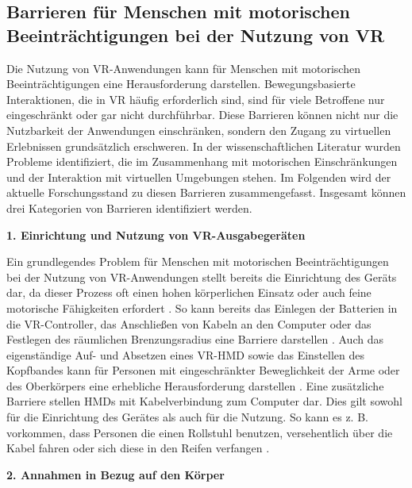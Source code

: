 \subsection{Barrieren für Menschen mit motorischen Beeinträchtigungen bei der Nutzung von VR}

Die Nutzung von VR-Anwendungen kann für Menschen mit motorischen Beeinträchtigungen eine Herausforderung darstellen. Bewegungsbasierte Interaktionen, die in VR häufig erforderlich sind, sind für viele Betroffene nur eingeschränkt oder gar nicht durchführbar. Diese Barrieren können nicht nur die Nutzbarkeit der Anwendungen einschränken, sondern den Zugang zu virtuellen Erlebnissen grundsätzlich erschweren. In der wissenschaftlichen Literatur wurden Probleme identifiziert, die im Zusammenhang mit motorischen Einschränkungen und der Interaktion mit virtuellen Umgebungen stehen. Im Folgenden wird der aktuelle Forschungsstand zu diesen Barrieren zusammengefasst. Insgesamt können drei Kategorien von Barrieren identifiziert werden.

{\normalfont \bfseries 1. Einrichtung und Nutzung von VR-Ausgabegeräten}  

Ein grundlegendes Problem für Menschen mit motorischen Beeinträchtigungen bei der Nutzung von VR-Anwendungen stellt bereits die Einrichtung des Geräts dar, da dieser Prozess oft einen hohen körperlichen Einsatz oder auch feine motorische Fähigkeiten erfordert \citep{gerling_critical_2021}. So kann bereits das Einlegen der Batterien in die VR-Controller, das Anschließen von Kabeln an den Computer oder das Festlegen des räumlichen Brenzungsradius eine Barriere darstellen \citep{mott_i_2020}. Auch das eigenständige Auf- und Absetzen eines VR-HMD sowie das Einstellen des Kopfbandes kann für Personen mit eingeschränkter Beweglichkeit der Arme oder des Oberkörpers eine erhebliche Herausforderung darstellen \citep{mott_i_2020}. Eine zusätzliche Barriere stellen HMDs mit Kabelverbindung zum Computer dar. Dies gilt sowohl für die Einrichtung des Gerätes als auch für die Nutzung. So kann es z. B.  vorkommen, dass Personen die einen Rollstuhl benutzen, versehentlich über die Kabel fahren oder sich diese in den Reifen verfangen \citep{mott_i_2020, wong_survey_2017}. 

{\normalfont \bfseries 2. Annahmen in Bezug auf den Körper} 
 
